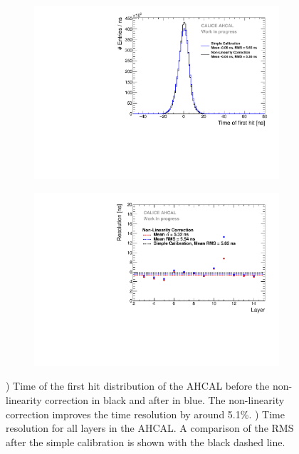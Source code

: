\begin{figure}[htbp!]
	\begin{subfigure}[t]{0.49\textwidth}
		\centering
		\includegraphics[width=1\textwidth]{../Thesis_Plots/Timing/Muons/Plots/Timing_AHCAL_LinCorrection.pdf}
		\caption{}\label{fig:timing_lincorrection}
	\end{subfigure}
	\hfill
	\begin{subfigure}[t]{0.49\textwidth}
		\centering
		\includegraphics[width=1\textwidth]{../Thesis_Plots/Timing/Muons/Plots/ResolutionPerModule_LinCorrection.pdf}
		\caption{}\label{fig:reso_lincorrection}
	\end{subfigure}
	\caption{) Time of the first hit distribution of the AHCAL before the non-linearity correction in black and after in blue. The non-linearity correction improves the time resolution by around 5.1\%. ) Time resolution for all layers in the AHCAL. A comparison of the RMS after the simple calibration is shown with the black dashed line.}
\end{figure}

